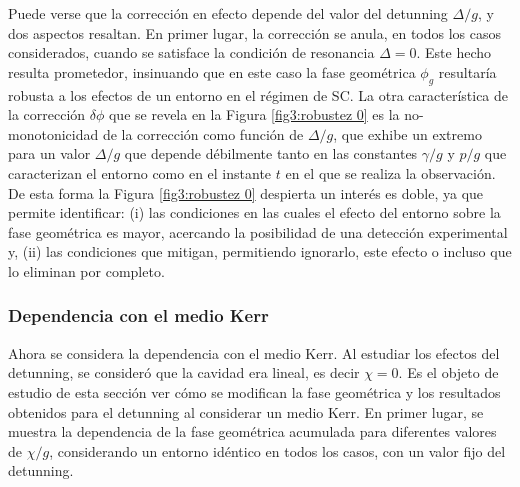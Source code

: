 Puede verse que la corrección en efecto depende del valor del detunning $\Delta/g$, y dos aspectos resaltan. En primer lugar, la corrección se anula, en todos los casos considerados, cuando se satisface la condición de resonancia $\Delta=0$. Este hecho resulta prometedor, insinuando que en este caso la fase geométrica $\phi_g$ resultaría robusta a los efectos de un entorno en el régimen de SC. La otra característica de la corrección $\delta\phi$ que se revela en la Figura \ref{fig3:robustez 0} es la no-monotonicidad de la corrección como función de $\Delta/g$, que exhibe un extremo para un valor $\Delta/g$ que depende débilmente tanto en las constantes $\gamma/g$ y $p/g$ que caracterizan el entorno como en el instante $t$ en el que se realiza la observación. De esta forma la Figura \ref{fig3:robustez 0} despierta un interés es doble, ya que permite identificar: (i) las condiciones en las cuales el efecto del entorno sobre la fase geométrica es mayor, acercando la posibilidad de una detección experimental y, (ii) las condiciones que mitigan, permitiendo ignorarlo, este efecto o incluso que lo eliminan por completo.

\subsubsection{Dependencia con el medio Kerr}

Ahora se considera la dependencia con el medio Kerr. Al estudiar los efectos del detunning, se consideró que la cavidad era lineal, es decir $\chi=0$. Es el objeto de estudio de esta sección ver cómo se modifican la fase geométrica y los resultados obtenidos para el detunning al considerar un medio Kerr. En primer lugar, se muestra la dependencia de la fase geométrica acumulada para diferentes valores de $\chi/g$, considerando un entorno idéntico en todos los casos, con un valor fijo del detunning.

